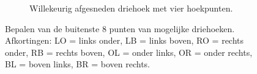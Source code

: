 \begin{figure}[h]
\begin{subfigure}{0.33\textwidth}
		\caption{Willekeurig afgesneden driehoek met vier hoekpunten.}
		\label{fig:SlechtAfgesnedenDriehoek}
	\end{subfigure}
	\caption{Bepalen van de buitenste 8 punten van mogelijke driehoeken. 
		\\ Afkortingen: LO = links onder, LB = links boven, RO = rechts onder, RB = rechts boven, OL = onder links, OR = onder rechts, BL = boven links, BR = boven rechts.}
	\label{fig:DrieGevallenDriehoeken}
\end{figure}

